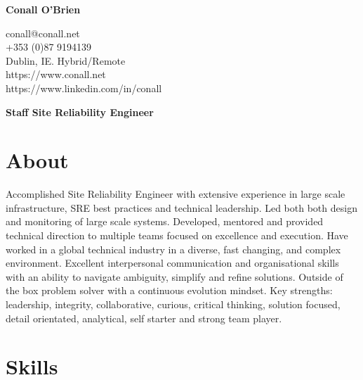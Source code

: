 \documentclass[a4paper, 10pt] {article}
\begin{document}
\begingroup
  \centering
  \LARGE \textbf{Conall O'Brien}\\[1.5em]
\endgroup


\begingroup
  \centering
  \small
      conall@conall.net \\
      +353 (0)87 9194139 \\
      Dublin, IE. Hybrid/Remote \\
      https://www.conall.net \\
      https://www.linkedin.com/in/conall \\
      \vspace{5mm} %
  \normalsize
\endgroup

\begingroup
  \centering
  \large \textbf{Staff Site Reliability Engineer}\\[1em]
\endgroup

\section*{About}

Accomplished Site Reliability Engineer with extensive experience in
large scale infrastructure, SRE best practices and technical leadership.
Led both both design and monitoring of large scale systems.
Developed, mentored and provided technical direction to multiple teams
focused on excellence and execution. Have worked in a global technical
industry in a diverse, fast changing, and complex environment. Excellent
interpersonal communication and organisational skills with an ability to
navigate ambiguity, simplify and refine solutions. Outside of the box
problem solver with a continuous evolution mindset. Key strengths:
leadership, integrity, collaborative, curious, critical thinking, solution
focused, detail orientated, analytical, self starter and strong team player.

\section*{Skills}
\end{document}
